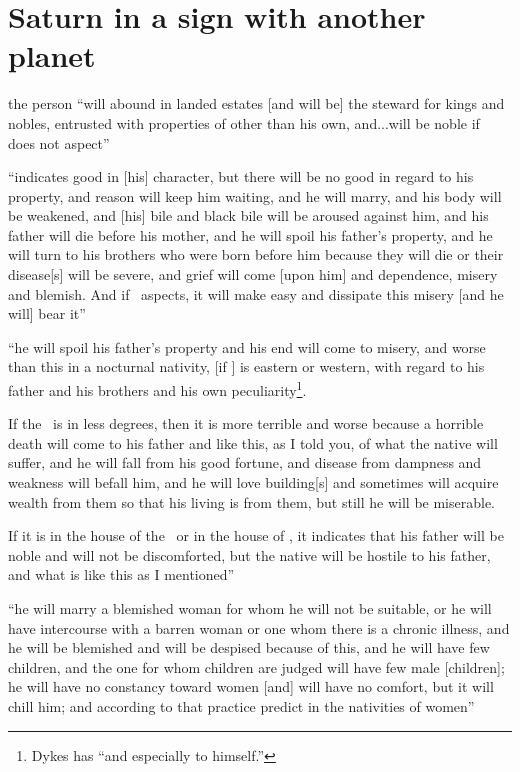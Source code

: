 \section{Saturn in a sign with another planet}
\begin{description}[style=multiline,leftmargin=1.5cm]
\item[\Saturn,\Jupiter]
the person ``will abound in landed estates [and will be] the steward for kings and nobles, entrusted with properties of other than his own, and...will be noble if \Mars\, does not aspect''

\item[\Saturn,\Mars]
``indicates good in [his] character, but there will be no good in regard to his property, and reason will keep him waiting, and he will marry, and his body will be weakened, and [his] bile and black bile will be aroused against him, and his father will die before his mother, and he will spoil his father's property, and he will turn to his brothers who were born before him because they will die or their disease[s] will be severe, and grief will come [upon him] and dependence, misery and blemish. And if \Jupiter\, aspects, it will make easy and dissipate this misery [and he will] bear it''

\item[\Saturn,\Sun] ``he will spoil his father's property and his end will come to misery, and worse than this in a nocturnal nativity, [if \Saturn] is eastern or western, with regard to his father and his brothers and his own peculiarity\footnote{Dykes has ``and especially to himself.''}. 

If the \Sun\, is in less degrees, then it is more terrible and worse because a horrible death will come to his father and like this, as I told you, of what the native will suffer, and he will fall from his good fortune, and disease from dampness and weakness will befall him, and he will love building[s] and sometimes will acquire wealth from them so that his living is from them, but still he will be miserable. 

If it is in the house of the \Sun\, or in the house of \Saturn, it indicates that his father will be noble and will not be discomforted, but the native will be hostile to his father, and what is like this as I mentioned''

\item[\Saturn,\Venus]
``he will marry a blemished woman for whom he will not be suitable, or he will have intercourse with a barren woman or one whom there is a chronic illness, and he will be blemished and will be despised because of this, and he will have few children, and the one for whom children are judged will have few male [children]; he will have no constancy toward women [and] will have no comfort, but it will chill him; and according to that practice predict in the nativities of women''


\end{description}
